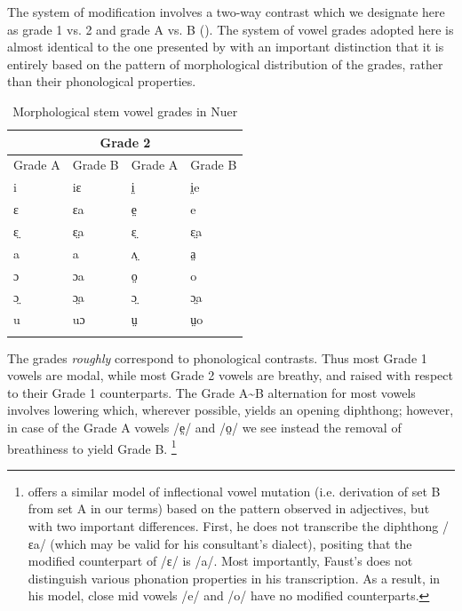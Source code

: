\documentclass[output=paper
,newtxmath
,modfonts
,nonflat]{langsci/langscibook}
\begin{document}
The system of  modification involves a two-way contrast which we designate here as grade 1 vs. 2 and grade A vs. B (). The system of vowel grades adopted here is almost identical to the one presented by \citet{reid2016} with an important distinction that it is entirely based on the pattern of morphological distribution of the grades, rather than their phonological properties.

\begin{table}
\begin{tabularx}{\textwidth}{XXXX}
\lsptoprule

\multicolumn{2}{c}{  Grade 1} & \multicolumn{2}{c}{  Grade 2}\\
\midrule
  Grade A &  Grade B &  Grade A &  Grade B\\
 i & iɛ & i̤ & i̤e\\
 ɛ & ɛa & e̤ & e\\
 ɛ̤ & ɛ̤a & ɛ̤ & ɛ̤a\\
 a & a & ʌ̤ & a̤\\
 ɔ & ɔa & o̤ & o\\
 ɔ̤ & ɔ̤a & ɔ̤ & ɔ̤a\\
 u & uɔ & ṳ & ṳo\\
\lspbottomrule
\end{tabularx}
\caption{Morphological stem vowel grades in Nuer}
\label{tab:monich:4}
\end{table}

The grades \textit{roughly} correspond to phonological contrasts.  Thus most Grade 1 vowels are modal, while most Grade 2 vowels are breathy, and raised with respect to their Grade 1 counterparts.  The Grade A{\textasciitilde}B alternation for most vowels involves lowering which, wherever possible, yields an opening diphthong; however, in case of the Grade A vowels /e̤/ and /o̤/ we see instead the removal of breathiness to yield Grade B. \footnote{\citet{Faust2017} offers a similar model of inflectional vowel mutation (i.e. derivation of set B from set A in our terms) based on the pattern observed in adjectives, but with two important differences.  First, he does not transcribe the diphthong /ɛa/ (which may be valid for his consultant’s dialect), positing that the modified counterpart of /ɛ/ is /a/.  Most importantly, Faust’s does not distinguish various phonation properties in his transcription.  As a result, in his model, close mid vowels /e/ and /o/ have no modified counterparts.}  
\end{document}
